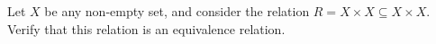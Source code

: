 Let $X$ be any non-empty set, and consider the relation $R = X \times X \subseteq X \times X$. Verify that this relation is an equivalence relation.